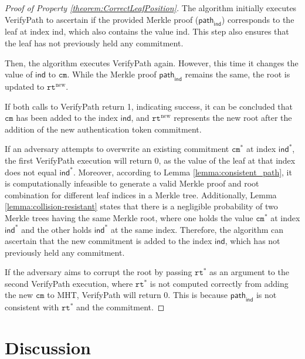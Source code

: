 \begin{proof} [Proof of Property \ref{theorem:CorrectLeafPosition}]
	The algorithm initially executes \textsf{VerifyPath} to ascertain if the provided Merkle proof ($\textsf{path}_\mathsf{ind}$) corresponds to  the leaf at index \textsf{ind}, which also contains the value \textsf{ind}. This step also ensures that the leaf has not previously held any commitment.
 
    Then, the algorithm executes \textsf{VerifyPath} again. However, this time it changes the value of $\textsf{ind}$ to $\texttt{cm}$. While the Merkle proof $\textsf{path}_\mathsf{ind}$ remains the same, the root is updated to $\texttt{rt}^\text{new}$. 
    
    If both calls to \textsf{VerifyPath} return 1, indicating success, it can be concluded that $\texttt{cm}$ has been added to the index $\textsf{ind}$, and $\texttt{rt}^\text{new}$ represents the new root after the addition of the new authentication token commitment.

    If an adversary attempts to overwrite an existing commitment $\texttt{cm}^*$ at index $\textsf{ind}^*$, the first \textsf{VerifyPath} execution will return 0, as the value of the leaf at that index does not equal $\textsf{ind}^*$. Moreover, according to Lemma \ref{lemma:consistent_path}, it is computationally infeasible to generate a valid Merkle proof and root combination for different leaf indices in a Merkle tree. Additionally, Lemma \ref{lemma:collision-resistant} states that there is a negligible probability of two Merkle trees having the same Merkle root, where one holds the value $\texttt{cm}^*$ at index $\textsf{ind}^*$ and the other holds $\textsf{ind}^*$ at the same index. Therefore, the algorithm can ascertain that the new commitment is added to the index $\textsf{ind}$, which has not previously held any commitment.
    
    If the adversary aims to corrupt the root by passing $\texttt{rt}^{*}$ as an argument to the second \textsf{VerifyPath} execution, where $\texttt{rt}^{*}$ is not computed correctly from adding the new $\texttt{cm}$ to \textsf{MHT}, \textsf{VerifyPath} will return 0. This is because $\textsf{path}_\mathsf{ind}$ is not consistent with $\texttt{rt}^{*}$ and the commitment.
\end{proof}


\section{Discussion}

